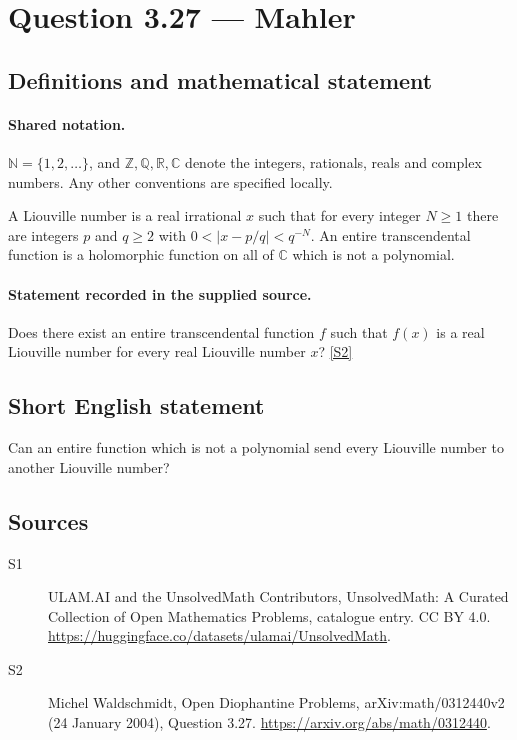 \documentclass[11pt]{article}
\newcommand{\sref}[2]{\hyperlink{source:#1:#2}{[S#2]}}
\begin{document}
\section{Question 3.27 — Mahler}\label{statement}

\subsection{Definitions and mathematical statement}

\paragraph{Shared notation.}$\mathbb N=\{1,2,\ldots\}$, and $\mathbb Z,\mathbb Q,\mathbb R,\mathbb C$ denote the integers, rationals, reals and complex numbers. Any other conventions are specified locally.


A Liouville number is a real irrational $x$ such that for every integer $N\ge1$ there are integers $p$ and $q\ge2$ with $0<|x-p/q|<q^{-N}$. An entire transcendental function is a holomorphic function on all of $\mathbb C$ which is not a polynomial.
\paragraph{Statement recorded in the supplied source.}
Does there exist an entire transcendental function $f$ such that $f(x)$ is a real Liouville number for every real Liouville number $x$? \sref{statement}{2}
\subsection{Short English statement}
Can an entire function which is not a polynomial send every Liouville number to another Liouville number?
\subsection{Sources}
\begin{description}
\item[\hypertarget{source:statement:1}{S1}] ULAM.AI and the UnsolvedMath Contributors, UnsolvedMath: A Curated Collection of Open Mathematics Problems, catalogue entry. CC BY 4.0. \url{https://huggingface.co/datasets/ulamai/UnsolvedMath}.
\item[\hypertarget{source:statement:2}{S2}] Michel Waldschmidt, Open Diophantine Problems, arXiv:math/0312440v2 (24 January 2004), Question 3.27. \url{https://arxiv.org/abs/math/0312440}.
\end{description}
\label{end:statement}
\end{document}
